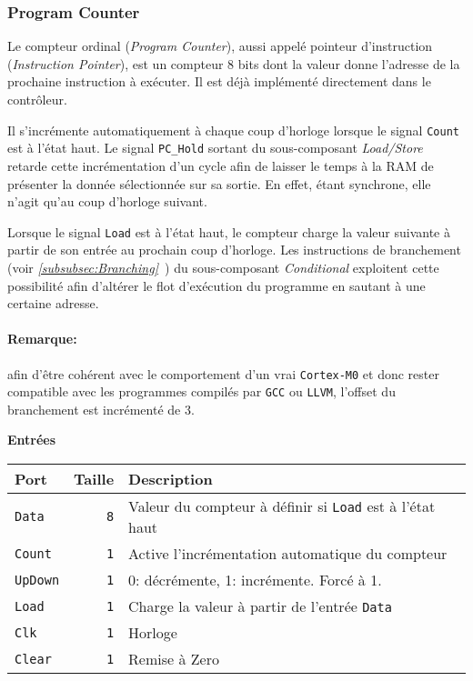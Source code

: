 \subsubsection{Program Counter}


Le compteur ordinal (\textit{Program Counter}), aussi appelé pointeur d'instruction (\textit{Instruction Pointer}),
est un compteur 8 bits dont la valeur donne l'adresse de la prochaine instruction à exécuter.
Il est déjà implémenté directement dans le contrôleur.

Il s'incrémente automatiquement à chaque coup d'horloge lorsque le signal \texttt{Count} est à l'état haut.
Le signal \texttt{PC\_Hold} sortant du sous-composant \textit{Load/Store} retarde cette incrémentation d'un cycle afin de laisser le temps à la RAM de présenter la donnée sélectionnée sur sa sortie.
En effet, étant synchrone, elle n'agit qu'au coup d'horloge suivant.

Lorsque le signal \texttt{Load} est à l'état haut, le compteur charge la valeur suivante à partir de son entrée au prochain coup d'horloge.
Les instructions de branchement (voir \textit{\ref{subsubsec:Branching}~}) du sous-composant \textit{Conditional} exploitent cette possibilité
afin d'altérer le flot d'exécution du programme en sautant à une certaine adresse.

\paragraph{Remarque:} afin d'être cohérent avec le comportement d'un vrai \texttt{Cortex-M0} et donc rester compatible avec les programmes compilés par \texttt{GCC} ou \texttt{LLVM},
l'offset du branchement est incrémenté de 3.


\textbf{Entrées}\\

\begin{tabular}{|l|r|l|}
\hline
\textbf{Port}		& \textbf{Taille} & \textbf{Description}\\
\hline

\texttt{Data}		&  \texttt{8} & Valeur du compteur à définir si \texttt{Load} est à l'état haut\\
\hline
\texttt{Count}		&  \texttt{1} & Active l'incrémentation automatique du compteur\\
\hline
\texttt{UpDown}		&  \texttt{1} & 0: décrémente, 1: incrémente. Forcé à 1.\\
\hline
\texttt{Load}		&  \texttt{1} & Charge la valeur à partir de l'entrée \texttt{Data}\\
\hline
\texttt{Clk}		&  \texttt{1} & Horloge\\
\hline
\texttt{Clear}		&  \texttt{1} & Remise à Zero\\
\hline


\hline
\end{tabular}

